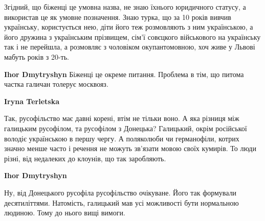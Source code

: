 \begin{itemize}
\begin{itemize}
 

Згідний, що біженці це умовна назва, не знаю їхнього юридичного статусу, а
використав це як умовне позначення. Знаю турка, що за 10 років вивчив
українську, користується нею, діти його теж розмовляють з ним українською, а
його дружина з українським прізвищем, сім'ї совєцкого військового на українську
так і не перейшла, а розмовляє з чоловіком окупантомовною, хоч живе у Львові
мабуть років з 20-ть.


 
\textbf{Ihor Dmytryshyn} Біженці це окреме питання. Проблема в тім, що питома частка галичан толерує москвояз.

 
\textbf{Iryna Terletska} 

Так, русофільство має давні корені, втім не тільки воно. А яка різниця між
галицьким русофілом, та русофілом з Донецька? Галицький, окрім російської
володіє українською в першу чергу. А поляколюби чи германофіли, котрих значно
менше часто і речення не можуть зв'язати мовою своїх кумирів. То люди різні,
від недалеких до клоунів, що так заробляють.


 
\textbf{Ihor Dmytryshyn} 

Ну, від Донецького русофіла русофільство очікуване. Його так формували
десятиліттями. Натомість, галицький мав усі можливості бути нормальною людиною.
Тому до нього вищі вимоги.

\end{itemize}


\end{itemize}
